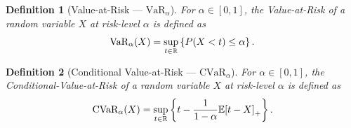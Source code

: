 \documentclass[10pt]{article}
\newtheorem{definition}{Definition}
\newcommand{\cvaralpha}{\text{CVaR}_\alpha}
\newcommand{\varalpha}{\text{VaR}_\alpha}
\theoremstyle{plain}
\theoremstyle{remark}
\begin{document}
\begin{definition}[Value-at-Risk --- $\varalpha$]\label{def:var}
        For $\alpha \in [0, 1]$, the Value-at-Risk of a random variable 
        $X$ at risk-level $\alpha$ is defined as
        \[
                \varalpha(X) = \sup_{t \in \Real} \left\{ P(X < t) \leq \alpha \right\}. 
        \]
\end{definition}

\begin{definition}[Conditional Value-at-Risk --- $\cvaralpha$]\label{def:cvar}
        For $\alpha \in [0, 1]$, the Conditional-Value-at-Risk of a random variable 
        $X$ at risk-level $\alpha$ is defined as
        \[
                \cvaralpha(X) = \sup_{t \in \Real} \left\{ t - \frac{1}{1 - \alpha} \mathbb{E}{[t - X]}_+ \right\}.
        \]
\end{definition}
\end{document}
